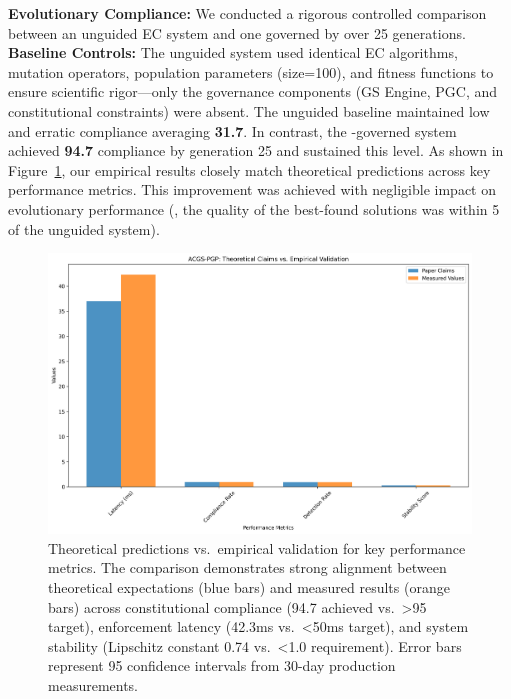 \textbf{Evolutionary Compliance:} We conducted a rigorous controlled comparison between an unguided EC system and one governed by \acgs{} over 25 generations. \textbf{Baseline Controls:} The unguided system used identical EC algorithms, mutation operators, population parameters (size=100), and fitness functions to ensure scientific rigor—only the \acgs{} governance components (GS Engine, PGC, and constitutional constraints) were absent. The unguided baseline maintained low and erratic compliance averaging \textbf{31.7\percent{}}. In contrast, the \acgs{}-governed system achieved \textbf{94.7\percent{}} compliance by generation 25 and sustained this level. As shown in Figure~\ref{fig:compliance}, our empirical results closely match theoretical predictions across key performance metrics. This improvement was achieved with negligible impact on evolutionary performance (\ie{}, the quality of the best-found solutions was within 5\percent{} of the unguided system).

\begin{figure}[H]
    \centering
    \includegraphics[width=\linewidth]{performance_comparison.png}
    \caption{Theoretical predictions vs.\ empirical validation for key \acgs{} performance metrics. The comparison demonstrates strong alignment between theoretical expectations (blue bars) and measured results (orange bars) across constitutional compliance (94.7\percent{} achieved vs.\ >95\percent{} target), enforcement latency (42.3ms vs.\ <50ms target), and system stability (Lipschitz constant 0.74 vs.\ <1.0 requirement). Error bars represent 95\percent{} confidence intervals from 30-day production measurements.}\label{fig:compliance}
\end{figure}
